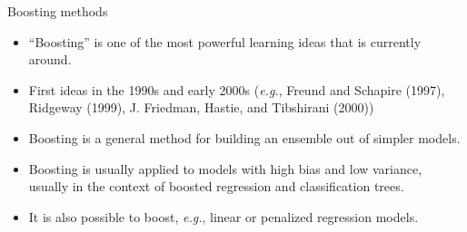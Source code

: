 \documentclass[
  10pt,
  ignorenonframetext,
]{beamer}
\providecommand{\tightlist}{%
  \setlength{\itemsep}{0pt}\setlength{\parskip}{0pt}}
\begin{document}
\begin{frame}
\begin{block}{Boosting methods}
\label{boosting-methods}
\(~\)

\begin{itemize}
\tightlist
\item
  ``Boosting'' is one of the most powerful learning ideas that is
  currently around.
\end{itemize}

\vspace{2mm}

\begin{itemize}
\tightlist
\item
  First ideas in the 1990s and early 2000s (\emph{e.g.}, Freund and
  Schapire (1997), Ridgeway (1999), J. Friedman, Hastie, and Tibshirani
  (2000))
\end{itemize}

\vspace{2mm}

\begin{itemize}
\tightlist
\item
  Boosting is a general method for building an ensemble out of simpler
  models.
\end{itemize}

\vspace{2mm}

\begin{itemize}
\tightlist
\item
  Boosting is usually applied to models with high bias and low variance,
  usually in the context of boosted regression and classification trees.
\end{itemize}

\vspace{2mm}

\begin{itemize}
\tightlist
\item
  It is also possible to boost, \emph{e.g.}, linear or penalized
  regression models.
\end{itemize}
\end{block}
\end{frame}
\end{document}
